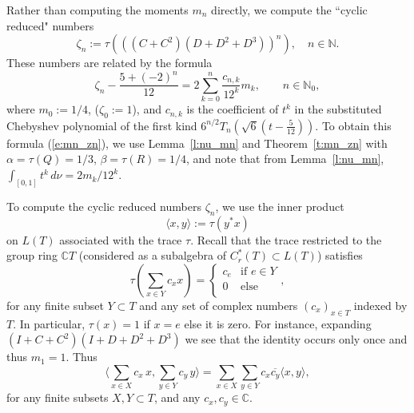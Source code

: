 \documentclass{amsart}
\newcommand{\C}{\mathbb C}
\newcommand{\N}{\mathbb N}
\theoremstyle{definition}
\begin{document}
Rather than computing the moments $m_n$ directly, we compute the ``cyclic reduced" numbers 
$$\zeta_n:=\tau(((C+C^2)(D+D^2+D^3))^n),\quad n\in\N.$$
These numbers are related by the formula 
\begin{equation}\label{e:mn_zn}
\zeta_n - \frac{5+(-2)^n}{12}= 2 \sum_{k=0}^n \frac{c_{n,k}}{12^k} m_k, \qquad n\in \N_0,
\end{equation}
where $m_0:=1/4$, ($\zeta_0:=1$), and $c_{n,k}$ is the coefficient of $t^k$ in the substituted Chebyshev polynomial of the first kind $6^{n/2}T_n( \sqrt6(t-\frac5{12}))$. 
To obtain this formula (\ref{e:mn_zn}), we use Lemma~\ref{l:nu_mn} and Theorem~\ref{t:mn_zn} with $\alpha=\tau(Q)=1/3$,  $\beta=\tau(R)=1/4$, and note that from Lemma~\ref{l:nu_mn},  $\int_{[0,1]}t^k\,d\nu=2 m_k/12^k$.

To compute the cyclic reduced numbers $\zeta_n$, we use the inner product 
$$\langle x,y\rangle :=\tau(y^*x)$$ on $L(T)$ associated with the trace $\tau$. 
Recall that the trace restricted to the group ring $\C T$ (considered as a subalgebra of $C_r^*(T)\subset L(T)$)
satisfies
$$\tau(\sum_{x\in Y} c_x x)=  \left\{\begin{array}{cc}
    c_e & \mathrm{if }\,\, e\in Y  \\ 
    0 & \mathrm{else} \\ 
  \end{array}\right.,
$$ 
for any finite subset $Y\subset T$ and any set of complex numbers $(c_x)_{x\in T}$ indexed by $T$.
In particular,  $\tau(x)=1$ if $x=e$ else it is zero.
For instance, expanding $(I+C+C^2)(I+D+D^2+D^3)$ we see that the identity occurs only once and thus $m_1=1$.
Thus 
\begin{equation}\label{e:innerproduct}
\langle \sum_{x\in X} c_x\, x, \sum_{y\in Y} c_y\, y\rangle =  \sum_{x\in X}  \sum_{y\in Y} c_x\overline{c_y} \langle x, y\rangle,
\end{equation}
for any finite subsets $X,Y\subset T$, and any $c_x,c_y\in \C$.
\end{document}
